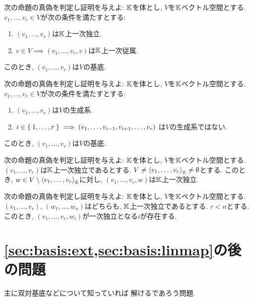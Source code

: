 \begin{quiz}
  次の命題の真偽を判定し証明を与えよ:
  $\mathbb{K}$を体とし,
  $V$を$\mathbb{K}$ベクトル空間とする.
  $v_1,\ldots, v_r\in V$が次の条件を満たすとする:
  \begin{enumerate}
  \item $(v_1,\ldots, v_r)$は$\mathbb{K}$上一次独立.
  \item $v\in V\implies (v_1,\ldots, v_r,v)$は$\mathbb{K}$上一次従属.
  \end{enumerate}
  このとき,
  $(v_1,\ldots, v_r)$は$V$の基底.
\end{quiz}


\begin{quiz}
  次の命題の真偽を判定し証明を与えよ:
  $\mathbb{K}$を体とし,
  $V$を$\mathbb{K}$ベクトル空間とする.
  $v_1,\ldots, v_r\in V$が次の条件を満たすとする:
  \begin{enumerate}
  \item $(v_1,\ldots, v_r)$は$V$の生成系.
  \item
    $i\in \Set{1,\ldots,r}\implies (v_1,\ldots, v_{i-1},v_{i+1},\ldots,v_r)$
    は$V$の生成系ではない.
  \end{enumerate}
  このとき,
  $(v_1,\ldots, v_r)$は$V$の基底.
\end{quiz}

\begin{quiz}
  次の命題の真偽を判定し証明を与えよ:
$\mathbb{K}$を体とし,
  $V$を$\mathbb{K}$ベクトル空間とする.
  $(v_1,\ldots, v_r)$は$\mathbb{K}$上一次独立であるとする.
  $V\neq\Braket{v_1,\ldots, v_r}_{\mathbb{K}}\neq \emptyset$とする.
  このとき, $w\in V\setminus\Braket{v_1,\ldots, v_r}_{\mathbb{K}}$に対し,
  $(v_1,\ldots,v_{r},w)$は$\mathbb{K}$上一次独立.
\end{quiz}

\begin{quiz}
  次の命題の真偽を判定し証明を与えよ:
$\mathbb{K}$を体とし,
  $V$を$\mathbb{K}$ベクトル空間とする.
  $(v_1,\ldots, v_r)$,
  $(w_1,\ldots, w_n)$はどちらも,
  $\mathbb{K}$上一次独立であるとする.
$r<n$とする.
  このとき,
$(v_1,\ldots,v_{r},w_{i})$が一次独立となる$i$が存在する.
\end{quiz}



%
\section{\cref{sec:basis:ext,sec:basis:linmap}の後の問題}
主に双対基底などについて知っていれば
解けるであろう問題.

